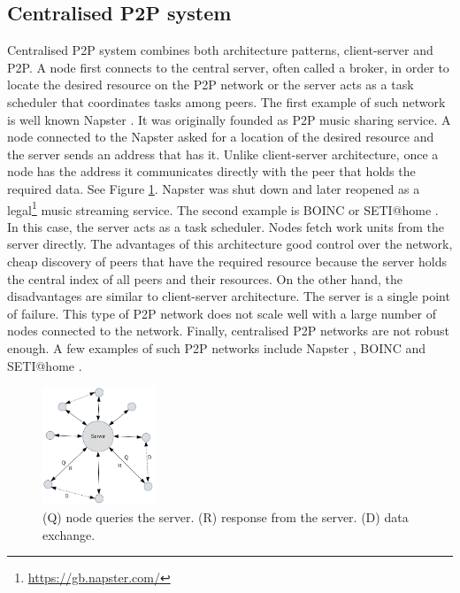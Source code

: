 \subsection{Centralised P2P system}
\quad Centralised P2P system combines both architecture patterns, client-server and P2P. A node first connects to the central server, often called a broker, in order to locate the desired resource on the P2P network or the server acts as a task scheduler that coordinates tasks among peers. The first example of such network is well known Napster \cite{noauthor_napster_2018}. It was originally founded as P2P music sharing service. A node connected to the Napster asked for a location of the desired resource and the server sends an address that has it. Unlike client-server architecture, once a node has the address it communicates directly with the peer that holds the required data. See Figure \ref{fig:centralised-p2p}. Napster was shut down and later reopened as a legal\footnote{\url{https://gb.napster.com/}} music streaming service. The second example is BOINC \cite{noauthor_boincpapers_nodate} or SETI@home \cite{noauthor_setihome_nodate}. In this case, the server acts as a task scheduler. Nodes fetch work units from the server directly. The advantages of this architecture good control over the network, cheap discovery of peers that have the required resource because the server holds the central index of all peers and their resources. On the other hand, the disadvantages are similar to client-server architecture. The server is a single point of failure. This type of P2P network does not scale well with a large number of nodes connected to the network. Finally, centralised P2P networks are not robust enough. A few examples of such P2P networks include Napster \cite{noauthor_napster_2018}, BOINC \cite{noauthor_boincpapers_nodate} and SETI@home \cite{noauthor_setihome_nodate}.

\begin{figure}[ht]
	\centering
	\includegraphics[width=0.3\textwidth]{images/centralised-p2p.png}
	\caption{\label{fig:centralised-p2p}(Q) node queries the server. (R) response from the server. (D) data exchange.}
\end{figure}

